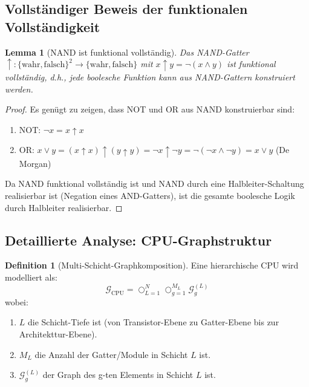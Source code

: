 \documentclass[12pt, a4paper]{article}
\newtheorem{lemma}[theorem]{Lemma}
\theoremstyle{definition}
\newtheorem{definition}[theorem]{Definition}
\theoremstyle{remark}
\newcommand{\Bool}{\{\mathrm{wahr}, \mathrm{falsch}\}}
\newcommand{\Graph}{\mathcal{G}}
\begin{document}
\subsection{Vollständiger Beweis der funktionalen Vollständigkeit}
\label{subsec:anhang_vollstaendige_vollstaendigkeit}

\begin{lemma}[NAND ist funktional vollständig]
\label{lem:nand_vollstaendig}
Das NAND-Gatter $\uparrow: \Bool^2 \to \Bool$ mit $x \uparrow y = \neg(x \land y)$ ist funktional vollständig, d.h., jede boolesche Funktion kann aus NAND-Gattern konstruiert werden.
\end{lemma}

\begin{proof}
Es genügt zu zeigen, dass NOT und OR aus NAND konstruierbar sind:
\begin{enumerate}[label=(\roman*)]
  \item NOT: $\neg x = x \uparrow x$
  \item OR: $x \lor y = (x \uparrow x) \uparrow (y \uparrow y) = \neg x \uparrow \neg y = \neg(\neg x \land \neg y) = x \lor y$ (De Morgan)
\end{enumerate}

Da NAND funktional vollständig ist und NAND durch eine Halbleiter-Schaltung realisierbar ist (Negation eines AND-Gatters), ist die gesamte boolesche Logik durch Halbleiter realisierbar.
\end{proof}

\subsection{Detaillierte Analyse: CPU-Graphstruktur}
\label{subsec:anhang_cpu_detail}

\begin{definition}[Multi-Schicht-Graphkomposition]
\label{def:multi_schicht_komposition}
Eine hierarchische CPU wird modelliert als:
\[
  \Graph_{\mathrm{CPU}} = \bigcirc_{L=1}^{N} \bigcirc_{g=1}^{M_L} \Graph_{g}^{(L)}
\]
wobei:
\begin{enumerate}[label=(\alph*)]
  \item $L$ die Schicht-Tiefe ist (von Transistor-Ebene zu Gatter-Ebene bis zur Architekttur-Ebene).
  \item $M_L$ die Anzahl der Gatter/Module in Schicht $L$ ist.
  \item $\Graph_{g}^{(L)}$ der Graph des g-ten Elements in Schicht $L$ ist.
\end{enumerate}
\end{definition}
\end{document}
